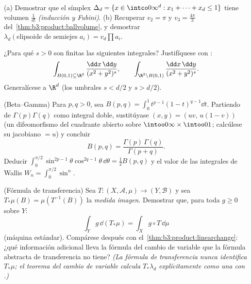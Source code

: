 \begin{exercise}[$\star\star$]\label{exo:b3:product:6}
(a) Demostrar que el símplex $\Delta_d = \{x \in \intco0\infty^d
: x_1 + \dots + x_d \leq 1\}$ tiene volumen $\frac1{d!}$
\emph{(inducción y Fubini)}. (b) Recuperar $v_2 = \pi$ y
$v_3 = \frac{4\pi}3$ del~\cref{thm:b3:product:ballvolume}, y demostrar
$\lambda_d(\text{elipsoide de semiejes } a_i) =
v_d\prod a_i$.
\end{exercise}

\begin{exercise}[$\star\star$]\label{exo:b3:product:7}
¿Para qué $s > 0$ son finitas las siguientes integrales? Justifíquese
con :
\[
\int_{B(0,1)\subseteq\R^2}\frac{\dd x\,\dd y}{(x^2 +
y^2)^{s}},
\qquad
\int_{\R^2\setminus B(0,1)}\frac{\dd x\,\dd y}{(x^2 +
y^2)^{s}} .
\]
Generalícese a $\R^d$ (los umbrales $s < d/2$ y $s > d/2$).
\end{exercise}

\begin{exercise}[$\star\star\star$]\label{exo:b3:product:8}
(Beta--Gamma) Para $p, q > 0$, sea $B(p, q) = \int_0^1t^{p-1}(1
- t)^{q-1}\dd t$. Partiendo de $\Gamma(p)\Gamma(q)$ como integral doble,
sustitúyase $(x, y) = (uv,\, u(1 - v))$ (un difeomorfismo del cuadrante
abierto sobre $\intoo0\infty\times\intoo01$; calcúlese su jacobiano
$= u$) y concluir
\[
B(p, q) = \frac{\Gamma(p)\,\Gamma(q)}{\Gamma(p + q)} .
\]
Deducir $\int_0^{\pi/2}\sin^{2p-1}\theta\cos^{2q-1}\theta\,
\dd\theta = \frac12B(p,q)$ y el valor de las integrales de Wallis
$W_n = \int_0^{\pi/2}\sin^n$.
\end{exercise}

\begin{exercise}[$\star\star$]\label{exo:b3:product:9}
(Fórmula de transferencia) Sea $T \colon (X, \mathcal A, \mu) \to (Y,
\mathcal B)$  y sea
$T_*\mu(B) = \mu(T^{-1}(B))$ la \emph{medida imagen}. Demostrar que, para toda $g \geq 0$
 sobre $Y$:
\[
\int_Y g\,\dd(T_*\mu) = \int_X g\circ T\,\dd\mu
\]
(máquina estándar). Compárese después con
el~\cref{thm:b3:product:linearchange}: ¿qué información adicional lleva
la fórmula del cambio de variable que la fórmula abstracta de
transferencia no tiene? \emph{(La fórmula de transferencia nunca
identifica $T_*\mu$; el teorema del cambio de variable calcula
$T_*\lambda_d$ explícitamente como una
 con
.)}
\end{exercise}

